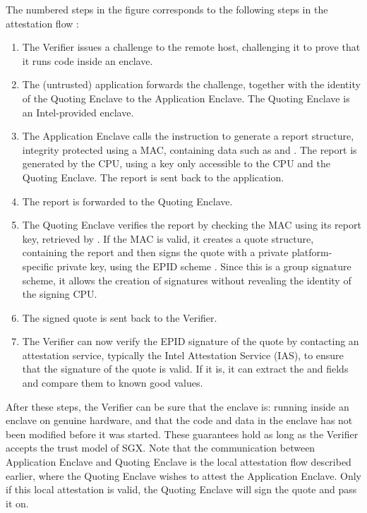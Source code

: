 The numbered steps in the figure corresponds to the following steps in the attestation flow \cite{anati:2013}:
\begin{enumerate}
	\item The Verifier issues a challenge to the remote host, challenging it to prove that it runs code inside an enclave.
	\item The (untrusted) application forwards the challenge, together with the identity of the Quoting Enclave to the Application Enclave.
	The Quoting Enclave is an Intel-provided enclave.
	\item The Application Enclave calls the \sgxreport{} instruction to generate a report structure, integrity protected using a MAC, containing data such as \sgxmrenclave{} and \sgxmrsigner{}.
	The report is generated by the CPU, using a key only accessible to the CPU and the Quoting Enclave.
	The report is sent back to the application.
	\item The report is forwarded to the Quoting Enclave.
	\item The Quoting Enclave verifies the report by checking the MAC using its report key, retrieved by \sgxgetkey{}.
	If the MAC is valid, it creates a quote structure, containing the report and then signs the quote with a private platform-specific private key, using the EPID scheme \cite{brickell:2010}.
	Since this is a group signature scheme, it allows the creation of signatures without revealing the identity of the signing CPU.
	\item The signed quote is sent back to the Verifier.
	\item The Verifier can now verify the EPID signature of the quote by contacting an attestation service, typically the Intel Attestation Service (IAS), to ensure that the signature of the quote is valid. If it is, it can extract the \sgxmrenclave{} and \sgxmrsigner{} fields and compare them to known good values.
\end{enumerate}
After these steps, the Verifier can be sure that the enclave is: running inside an enclave on genuine hardware, and that the code and data in the enclave has not been modified before it was started.
These guarantees hold as long as the Verifier accepts the trust model of SGX.
Note that the communication between Application Enclave and Quoting Enclave is the local attestation flow described earlier, where the Quoting Enclave wishes to attest the Application Enclave.
Only if this local attestation is valid, the Quoting Enclave will sign the quote and pass it on.

